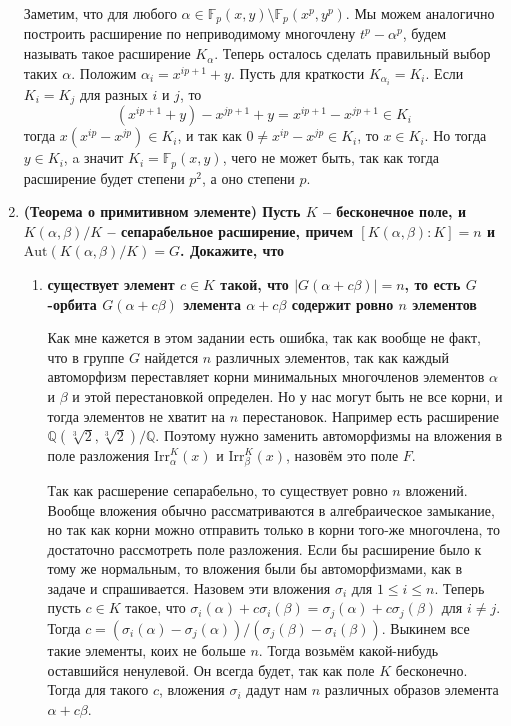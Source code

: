 \documentclass{article}
\begin{document}
\begin{enumerate}
        Заметим, что для любого $\alpha\in\mathbb{F}_p(x,y)\setminus\mathbb{F}_p
        (x^p,y^p)$. Мы можем аналогично построить расширение по неприводимому
        многочлену $t^p-\alpha^p$, будем называть такое расширение $K_\alpha$.
        Теперь осталось сделать правильный выбор таких $\alpha$. Положим
        $\alpha_i=x^{ip+1}+y$. Пусть для краткости $K_{\alpha_i}=K_i$. Если
        $K_i=K_j$ для разных $i$ и $j$, то
        \[(x^{ip+1}+y)-x^{jp+1}+y=x^{ip+1}-x^{jp+1}\in K_i\]
        тогда $x(x^{ip}-x^{jp})\in K_i$, и так как $0\neq x^{ip}-x^{jp}\in K_i$,
        то $x\in K_i$. Но тогда $y\in K_i$, a значит $K_i=\mathbb{F}_p(x,y)$,
        чего не может быть, так как тогда расширение будет степени $p^2$, а оно
        степени $p$.

    \item \textbf{(Теорема о примитивном элементе) Пусть $K$ – бесконечное поле,
        и $K(\alpha, \beta)/K$ – сепарабельное расширение, причем $[K(\alpha,
        \beta) : K] = n$ и $\text{Aut}(K(\alpha,\beta)/K) = G$. Докажите, что}
    \begin{enumerate}
        \item \textbf{существует элемент $c\in K$ такой, что $|G(\alpha+c\beta)|
            = n$, то есть $G$-орбита $G(\alpha+c\beta)$ элемента $\alpha+c\beta$
            содержит ровно $n$ элементов}

            Как мне кажется в этом задании есть ошибка, так как вообще не факт,
            что в группе $G$ найдется $n$ различных элементов, так как каждый
            автоморфизм переставляет корни минимальных многочленов элементов
            $\alpha$ и $\beta$ и этой перестановкой определен. Но у нас могут
            быть не все корни, и тогда элементов не хватит на $n$ перестановок.
            Например есть расширение $\mathbb{Q}(\sqrt[3]{2},\sqrt[3]{2})/
            \mathbb{Q}$. Поэтому нужно заменить автоморфизмы на вложения в поле
            разложения $\text{Irr}_\alpha^K(x)$ и $\text{Irr}_\beta^K(x)$,
            назовём это поле $F$.

            Так как расшерение сепарабельно, то существует ровно $n$ вложений.
            Вообще вложения обычно рассматриваются в алгебраическое замыкание,
            но так как корни можно отправить только в корни того-же многочлена,
            то достаточно рассмотреть поле разложения. Если бы расширение было
            к тому же нормальным, то вложения были бы автоморфизмами, как в
            задаче и спрашивается. Назовем эти вложения $\sigma_i$
            для $1\leq i\leq n$. Теперь пусть $c\in K$ такое, что $\sigma_i(\alpha)
            +c\sigma_i(\beta)=\sigma_j(\alpha)+c\sigma_j(\beta)$ для $i\neq j$.
            Тогда $c=(\sigma_i(\alpha)-\sigma_j(\alpha))/(\sigma_j(\beta)-\sigma_i(\beta))$.
            Выкинем все такие элементы, коих не больше $n$. Тогда возьмём
            какой-нибудь оставшийся ненулевой. Он всегда будет, так как поле $K$
            бесконечно. Тогда для такого $c$, вложения $\sigma_i$ дадут нам
            $n$ различных образов элемента $\alpha+c\beta$.


\end{enumerate}
\end{enumerate}
\end{document}
